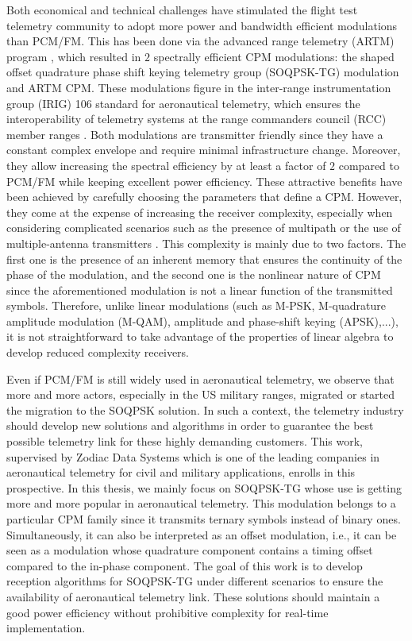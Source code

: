 Both economical and technical challenges have stimulated the flight test telemetry community to adopt more power and bandwidth efficient modulations than PCM/FM. This has been done via the advanced range telemetry (ARTM) program \cite{artm_prog}, which resulted in $2$ spectrally efficient CPM modulations: the shaped offset quadrature phase shift keying telemetry group (SOQPSK-TG) modulation and ARTM CPM. These modulations figure in the inter-range instrumentation group (IRIG) 106 standard for aeronautical telemetry, which ensures the interoperability of telemetry systems at the range commanders council (RCC) member ranges \cite{irig106}. Both modulations are transmitter friendly since they have a constant complex envelope and require minimal infrastructure change. Moreover, they allow increasing the spectral efficiency by at least a factor of $2$ compared to PCM/FM while keeping excellent power efficiency. These attractive benefits have been achieved by carefully choosing the parameters that define a CPM. However, they come at the expense of increasing the receiver complexity, especially when considering complicated scenarios such as the presence of multipath or the use of multiple-antenna transmitters \cite{jensen}. This complexity is mainly due to two factors. The first one is the presence of an inherent memory that ensures the continuity of the phase of the modulation, and the second one is the nonlinear nature of CPM since the aforementioned modulation is not a linear function of the transmitted symbols. Therefore, unlike linear modulations (such as M-PSK, M-quadrature amplitude modulation (M-QAM), amplitude and phase-shift keying (APSK),...), it is not straightforward to take advantage of the properties of linear algebra to develop reduced complexity receivers.    
   
Even if PCM/FM is still widely used in aeronautical telemetry, we observe that more and more actors, especially in the US military ranges, migrated or started the migration to the SOQPSK solution. In such a context, the telemetry industry should develop new solutions and algorithms in order to guarantee the best possible telemetry link for these highly demanding customers. This work, supervised by Zodiac Data Systems which is one of the leading companies in aeronautical telemetry for civil and military applications, enrolls in this prospective. In this thesis, we mainly focus on SOQPSK-TG whose use is getting more and more popular in aeronautical telemetry. This modulation belongs to a particular CPM family since it transmits ternary symbols instead of binary ones. Simultaneously, it can also be interpreted as an offset modulation, i.e., it can be seen as a modulation whose quadrature component contains a timing offset compared to the in-phase component. The goal of this work is to develop reception algorithms for SOQPSK-TG under different scenarios to ensure the availability of aeronautical telemetry link. These solutions should maintain a good power efficiency without prohibitive complexity for real-time implementation.

